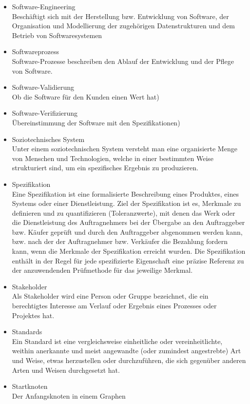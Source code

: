 \begin{itemize}
\item 	Software-Engineering\\
Beschäftigt sich mit der Herstellung bzw. Entwicklung von Software, der Organisation und Modellierung der zugehörigen Datenstrukturen und dem Betrieb von Softwaresystemen
\item 	Softwareprozess\\Software-Prozesse beschreiben den Ablauf der Entwicklung und der Pflege von Software.
\item 	Software-Validierung \\  Ob die Software für den Kunden einen Wert hat)
\item 	Software-Verifizierung \\ Übereinstimmung der Software mit den Spezifikationen)
\item 	Soziotechnisches System\\Unter einem soziotechnischen System versteht man eine organisierte Menge von Menschen und Technologien, welche in einer bestimmten Weise strukturiert sind, um ein spezifisches Ergebnis zu produzieren.
\item 	Spezifikation\\Eine Spezifikation  ist eine formalisierte Beschreibung eines Produktes, eines Systems oder einer Dienstleistung. Ziel der Spezifikation ist es, Merkmale zu definieren und zu quantifizieren (Toleranzwerte), mit denen das Werk oder die Dienstleistung des Auftragnehmers bei der Übergabe an den Auftraggeber bzw. Käufer geprüft und durch den Auftraggeber abgenommen werden kann, bzw. nach der der Auftragnehmer bzw. Verkäufer die Bezahlung fordern kann, wenn die Merkmale der Spezifikation erreicht wurden. Die Spezifikation enthält in der Regel für jede spezifizierte Eigenschaft eine präzise Referenz zu der anzuwendenden Prüfmethode für das jeweilige Merkmal.
\item 	Stakeholder\\
Als Stakeholder wird eine Person oder Gruppe bezeichnet, die ein berechtigtes Interesse am Verlauf oder Ergebnis eines Prozesses oder Projektes hat.
\item 	Standards\\Ein Standard ist eine vergleichsweise einheitliche oder vereinheitlichte, weithin anerkannte und meist angewandte (oder zumindest angestrebte) Art und Weise, etwas herzustellen oder durchzuführen, die sich gegenüber anderen Arten und Weisen durchgesetzt hat. 
\item 	Startknoten \\Der Anfangsknoten in einem Graphen

\end{itemize}
